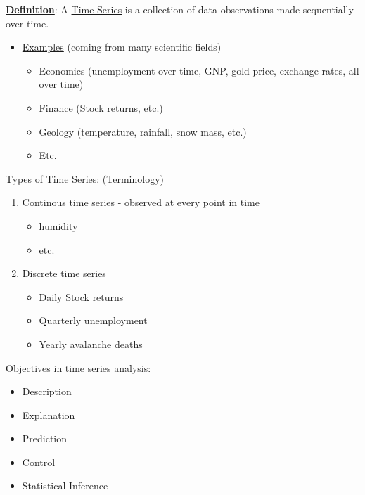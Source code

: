 \underline{\textbf{Definition}}: \quad A \underline{Time Series} is a collection of data observations made sequentially over time.


\begin{itemize}
    \item[] \underline{Examples} (coming from many scientific fields)
    \begin{itemize}[label=\textbullet]
        \item Economics (unemployment over time, GNP, gold price, exchange rates, all
        over time)
        \item Finance (Stock returns, etc.)
        \item Geology (temperature, rainfall, snow mass, etc.)
        \item Etc.  
    \end{itemize}
\end{itemize}

Types of Time Series: \quad (Terminology)

\begin{enumerate}
    \item Continous time series - observed at every point in time
    \begin{itemize}
        \item humidity
        \item etc.
    \end{itemize}
    \item Discrete time series
    \begin{itemize}
        \item Daily Stock returns
        \item Quarterly unemployment
        \item Yearly avalanche deaths
    \end{itemize}
\end{enumerate}

Objectives in time series analysis:

\begin{itemize}
    \item Description 
    \item Explanation
    \item Prediction
    \item Control
    \item Statistical Inference
\end{itemize}

